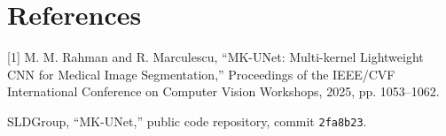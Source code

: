 \documentclass[10pt,a4paper]{article}
\begin{document}
\section*{References}
\footnotesize
[1] M. M. Rahman and R. Marculescu, ``MK-UNet: Multi-kernel Lightweight CNN for Medical Image Segmentation,'' Proceedings of the IEEE/CVF International Conference on Computer Vision Workshops, 2025, pp. 1053--1062.\par
[2] SLDGroup, ``MK-UNet,'' public code repository, commit \texttt{2fa8b23}.
\end{document}
